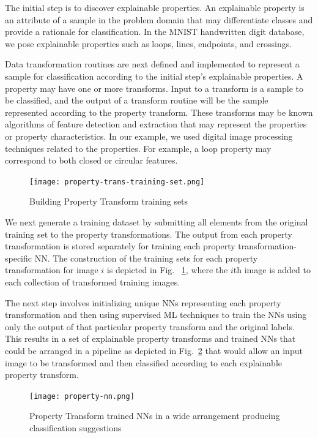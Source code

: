 \documentclass[conference]{IEEEtran}
\begin{document}
The initial step is to discover explainable properties.  An explainable property is an attribute of a sample in the problem domain that may differentiate classes and provide a rationale for classification.  In the MNIST handwritten digit database, we pose explainable properties such as loops, lines, endpoints, and crossings.

Data transformation routines are next defined and implemented to represent a sample for classification according to the initial step's explainable properties.  A property may have one or more transforms.  Input to a transform is a sample to be classified, and the output of a transform routine will be the sample represented according to the property transform.  These transforms may be known algorithms of feature detection and extraction that may represent the properties or property characteristics.  In our example, we used digital image processing techniques related to the properties.  For example, a loop property may correspond to both closed or circular features. 

\begin{figure}[htbp]
\centerline{\texttt{[image: property-trans-training-set.png]}}
\caption{Building Property Transform training sets}
\label{proptranstrain}
\end{figure}

We next generate a training dataset by submitting all elements from the original training set to the property transformations.  The output from each property transformation is stored separately for training each property transformation-specific NN.  The construction of the training sets for each property transformation for image $i$ is depicted in Fig. ~\ref{proptranstrain}, where the $i$th image is added to each collection of transformed training images.

The next step involves initializing unique NNs representing each property transformation and then using supervised ML techniques to train the NNs using only the output of that particular property transform and the original labels.  This results in a set of explainable property transforms and trained NNs that could be arranged in a pipeline as depicted in Fig.~\ref{widenn} that would allow an input image to be transformed and then classified according to each explainable property transform. 

\begin{figure}[htbp]
\centerline{\texttt{[image: property-nn.png]}}
\caption{Property Transform trained NNs in a wide arrangement producing classification suggestions}
\label{widenn}
\end{figure}
\end{document}
